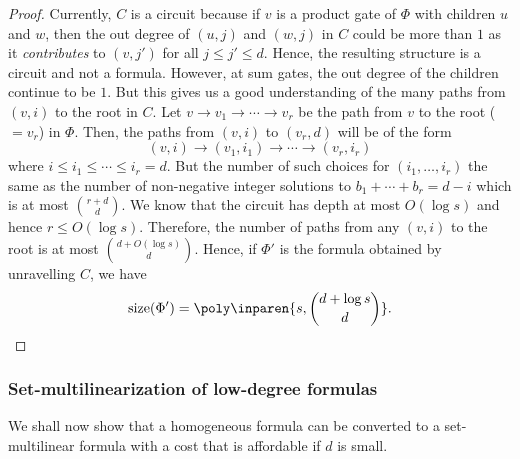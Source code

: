 \begin{proof}
\medskip

Currently, $C$ is a circuit because if $v$ is a product gate of $\Phi$ with children $u$ and $w$, then the out degree of $(u, j)$ and $(w, j)$ in $C$ could be more than $1$ as it \emph{contributes} to $(v,j')$ for all $j \leq j' \leq d$.
Hence, the resulting structure is a circuit and not a formula.
However, at sum gates, the out degree of the children continue to be $1$.
But this gives us a good understanding of the many paths from $(v,i)$ to the root in $C$.
Let $v\rightarrow v_1 \rightarrow \cdots \rightarrow v_r$ be the path from $v$ to the root ($=v_r$) in $\Phi$. Then, the paths from $(v,i)$ to $(v_r,d)$ will be of the form
\[
(v,i) \rightarrow (v_1,i_1) \rightarrow \cdots \rightarrow (v_r,i_r)
\]
where $i \leq i_1 \leq \cdots \leq i_r = d$.
But the number of such choices for $(i_1,\ldots, i_r)$ the same as the number of non-negative integer solutions to $b_1 + \cdots + b_r = d-i$ which is at most $\binom{r + d}{d}$.
We know that the circuit has depth at most $O(\log s)$ and hence $r \leq O(\log s)$.
Therefore, the number of paths from any $(v,i)$ to the root is at most $\binom{d + O(\log s)}{d}$.
Hence, if $\Phi'$ is the formula obtained by unravelling $C$, we have
\[
\mathrm{size}(\Phi') = \poly\inparen{s,\binom{d+\log s}{d}}.
\]
\end{proof}

\subsubsection*{Set-multilinearization of low-degree formulas}

We shall now show that a homogeneous formula can be converted to a set-multilinear formula with a cost that is affordable if $d$ is small. 

